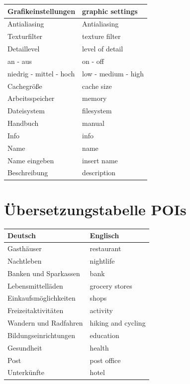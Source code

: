 \documentclass[10pt]{scrreprt}
\begin{document}
\begin{longtable}{|p{7.5cm}|p{7.5cm}|}
\hline
Grafikeinstellungen & graphic settings \\
\hline
Antialiasing & Antialiasing \\
\hline
Texturfilter & texture filter \\
\hline
Detaillevel & level of detail \\
\hline
an - aus & on - off \\
\hline
niedrig - mittel - hoch & low - medium - high\\
\hline
Cachegröße & cache size \\
\hline
Arbeitsspeicher & memory \\
\hline
Dateisystem & filesystem \\
\hline
Handbuch & manual \\
\hline
Info & info \\
\hline
Name & name \\
\hline
Name eingeben & insert name \\
\hline
Beschreibung & description \\
\hline
\end{longtable}

\newpage
\section{Übersetzungstabelle POIs}
\begin{longtable}{|p{7.5cm}|p{7.5cm}|}
\hline 
\textbf{Deutsch} & \textbf{Englisch} \\ 
\hline
\hline 
Gasthäuser & restaurant \\ 
\hline
Nachtleben & nightlife \\ 
\hline
Banken und Sparkassen & bank \\ 
\hline
Lebensmittelläden & grocery stores \\ 
\hline
Einkaufsmöglichkeiten & shops \\ 
\hline
Freizeitaktivitäten & activity \\ 
\hline
Wandern und Radfahren & hiking and cycling \\
\hline
Bildungseinrichtungen & education \\
\hline
Gesundheit & health \\
\hline
Post & post office \\ 
\hline
Unterkünfte & hotel \\
\hline
\end{longtable}
\end{document}
